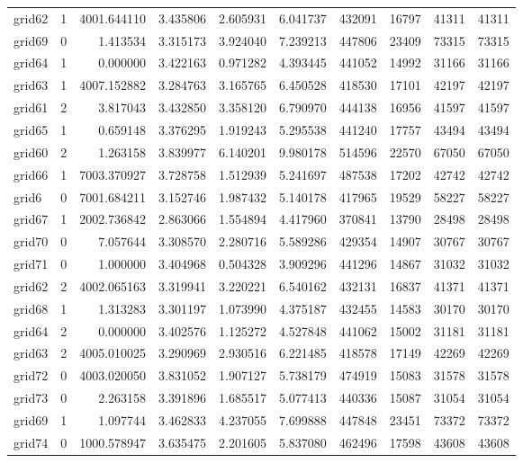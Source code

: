\begin{longtable}{|l|r|r|r|r|r|r|r|r|r|}
grid62 & 1 & 4001.644110 & 3.435806 & 2.605931 & 6.041737 & 432091 & 16797 & 41311 & 41311 \\
grid69 & 0 & 1.413534 & 3.315173 & 3.924040 & 7.239213 & 447806 & 23409 & 73315 & 73315 \\
grid64 & 1 & 0.000000 & 3.422163 & 0.971282 & 4.393445 & 441052 & 14992 & 31166 & 31166 \\
grid63 & 1 & 4007.152882 & 3.284763 & 3.165765 & 6.450528 & 418530 & 17101 & 42197 & 42197 \\
grid61 & 2 & 3.817043 & 3.432850 & 3.358120 & 6.790970 & 444138 & 16956 & 41597 & 41597 \\
grid65 & 1 & 0.659148 & 3.376295 & 1.919243 & 5.295538 & 441240 & 17757 & 43494 & 43494 \\
grid60 & 2 & 1.263158 & 3.839977 & 6.140201 & 9.980178 & 514596 & 22570 & 67050 & 67050 \\
grid66 & 1 & 7003.370927 & 3.728758 & 1.512939 & 5.241697 & 487538 & 17202 & 42742 & 42742 \\
grid6 & 0 & 7001.684211 & 3.152746 & 1.987432 & 5.140178 & 417965 & 19529 & 58227 & 58227 \\
grid67 & 1 & 2002.736842 & 2.863066 & 1.554894 & 4.417960 & 370841 & 13790 & 28498 & 28498 \\
grid70 & 0 & 7.057644 & 3.308570 & 2.280716 & 5.589286 & 429354 & 14907 & 30767 & 30767 \\
grid71 & 0 & 1.000000 & 3.404968 & 0.504328 & 3.909296 & 441296 & 14867 & 31032 & 31032 \\
grid62 & 2 & 4002.065163 & 3.319941 & 3.220221 & 6.540162 & 432131 & 16837 & 41371 & 41371 \\
grid68 & 1 & 1.313283 & 3.301197 & 1.073990 & 4.375187 & 432455 & 14583 & 30170 & 30170 \\
grid64 & 2 & 0.000000 & 3.402576 & 1.125272 & 4.527848 & 441062 & 15002 & 31181 & 31181 \\
grid63 & 2 & 4005.010025 & 3.290969 & 2.930516 & 6.221485 & 418578 & 17149 & 42269 & 42269 \\
grid72 & 0 & 4003.020050 & 3.831052 & 1.907127 & 5.738179 & 474919 & 15083 & 31578 & 31578 \\
grid73 & 0 & 2.263158 & 3.391896 & 1.685517 & 5.077413 & 440336 & 15087 & 31054 & 31054 \\
grid69 & 1 & 1.097744 & 3.462833 & 4.237055 & 7.699888 & 447848 & 23451 & 73372 & 73372 \\
grid74 & 0 & 1000.578947 & 3.635475 & 2.201605 & 5.837080 & 462496 & 17598 & 43608 & 43608 \\

\end{longtable}

